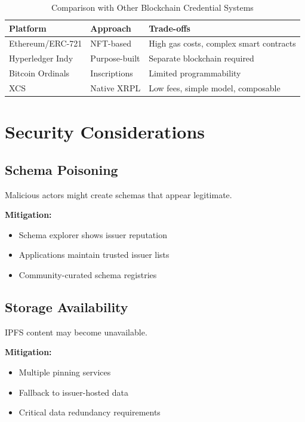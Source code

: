 \documentclass[11pt,a4paper]{article}
\begin{document}
\begin{table}[h]
\centering
\begin{tabular}{p{3cm}p{5cm}p{5cm}}
\toprule
\textbf{Platform} & \textbf{Approach} & \textbf{Trade-offs} \\
\midrule
Ethereum/ERC-721 & NFT-based & High gas costs, complex smart contracts \\
Hyperledger Indy & Purpose-built & Separate blockchain required \\
Bitcoin Ordinals & Inscriptions & Limited programmability \\
XCS & Native XRPL & Low fees, simple model, composable \\
\bottomrule
\end{tabular}
\caption{Comparison with Other Blockchain Credential Systems}
\end{table}

\section{Security Considerations}

\subsection{Schema Poisoning}

Malicious actors might create schemas that appear legitimate. 

\textbf{Mitigation:}
\begin{itemize}
    \item Schema explorer shows issuer reputation
    \item Applications maintain trusted issuer lists
    \item Community-curated schema registries
\end{itemize}

\subsection{Storage Availability}

IPFS content may become unavailable. 

\textbf{Mitigation:}
\begin{itemize}
    \item Multiple pinning services
    \item Fallback to issuer-hosted data
    \item Critical data redundancy requirements
\end{itemize}
\end{document}
